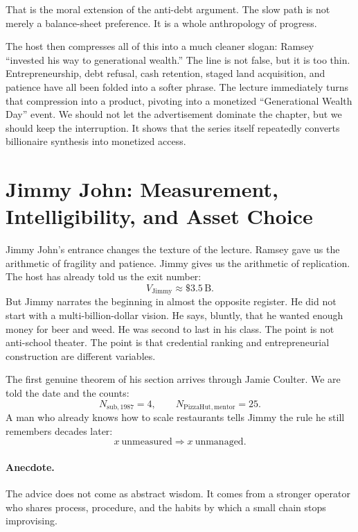 That is the moral extension of the anti-debt argument. The slow path is not merely a balance-sheet preference. It is a whole anthropology of progress.

The host then compresses all of this into a much cleaner slogan: Ramsey ``invested his way to generational wealth.'' The line is not false, but it is too thin. Entrepreneurship, debt refusal, cash retention, staged land acquisition, and patience have all been folded into a softer phrase. The lecture immediately turns that compression into a product, pivoting into a monetized ``Generational Wealth Day'' event. We should not let the advertisement dominate the chapter, but we should keep the interruption. It shows that the series itself repeatedly converts billionaire synthesis into monetized access.

\section{Jimmy John: Measurement, Intelligibility, and Asset Choice}

Jimmy John's entrance changes the texture of the lecture. Ramsey gave us the arithmetic of fragility and patience. Jimmy gives us the arithmetic of replication. The host has already told us the exit number:
\begin{equation}
V_{\mathrm{Jimmy}} \approx \$3.5\,\mathrm{B}.
\end{equation}
But Jimmy narrates the beginning in almost the opposite register. He did not start with a multi-billion-dollar vision. He says, bluntly, that he wanted enough money for beer and weed. He was second to last in his class. The point is not anti-school theater. The point is that credential ranking and entrepreneurial construction are different variables.

The first genuine theorem of his section arrives through Jamie Coulter. We are told the date and the counts:
\begin{equation}
N_{\mathrm{sub},1987}=4,\qquad N_{\mathrm{PizzaHut,mentor}}=25.
\end{equation}
A man who already knows how to scale restaurants tells Jimmy the rule he still remembers decades later:
\begin{equation}
x\ \text{unmeasured} \Rightarrow x\ \text{unmanaged}.
\end{equation}

\paragraph{Anecdote.} The advice does not come as abstract wisdom. It comes from a stronger operator who shares process, procedure, and the habits by which a small chain stops improvising.

